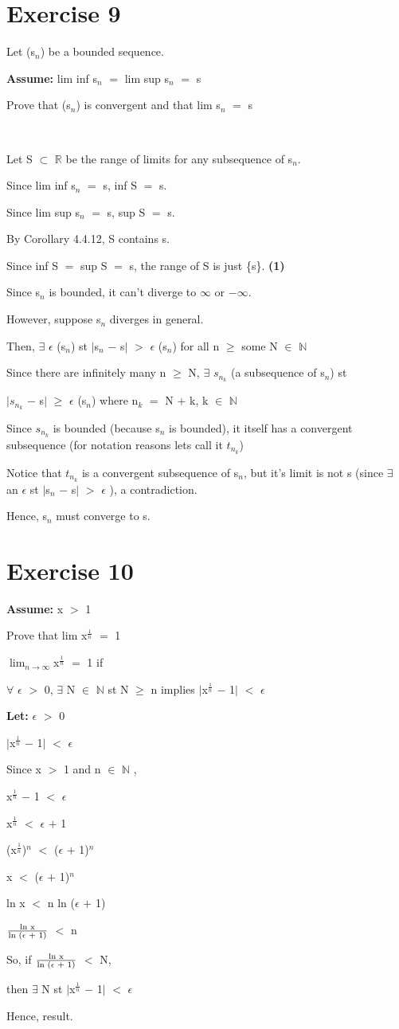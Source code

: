 \documentclass{article}
\newcommand{\mt}[1]{\ensuremath{#1}}
\newcommand\bsc[2][\DefaultOpt]{%
  \def\DefaultOpt{#2}%
  \section[#1]{#2}%
}
\newcommand{\lt}[1]{\textbf{Let: } #1}
\newcommand{\as}[1]{\textbf{Assume: } #1}
\newcommand{\bpth}[1]{\textbf{(#1)}}
\newcommand{\dbs}[3]{\mt{#1_{#2_#3}}}
\newcommand{\br}{\mt{\mathbb{R}} }       %
\newcommand{\bn}{\mt{\mathbb{N}} }       %
\newcommand{\ep}{\mt{\epsilon} }         %
\newcommand{\fa}{\mt{\forall} }          %
\newcommand{\mem}{\mt{\in} }
\newcommand{\exs}{\mt{\exists} }
\newcommand{\sbs}{\mt{\subset} }         %
\newcommand{\av}[1]{\mt{|}#1\mt{|}}  %
\newcommand{\prn}[1]{(#1)}
\newcommand{\bk}[1]{\{#1\}}
\newcommand{\ps}{\mt{+} }
\newcommand{\ms}{\mt{-} }
\newcommand{\ls}{\mt{<} }
\newcommand{\gr}{\mt{>} }
\newcommand{\gre}{\mt{\geq} }
\newcommand{\eql}{\mt{=} }
\newcommand{\uw}[2]{#1\mt{_{#2}}}
\newcommand{\uf}[2]{#1\mt{^{#2}}}
\newcommand{\frc}[2]{\mt{\frac{#1}{#2}}}
\newcommand{\lmti}[1]{\mt{\displaystyle{\lim_{#1 \to \infty}}}}
\newcommand{\infy}{\mt{\infty} }
\begin{document}
\bsc{Exercise 9}{

Let \prn{\uw{s}{n}} be a bounded sequence.

\as{lim inf \uw{s}{n} \eql lim sup \uw{s}{n} \eql s}

Prove that \prn{\uw{s}{n}} is convergent and that lim \uw{s}{n} \eql s

\

Let S \sbs \br be the range of limits for any subsequence of \uw{s}{n}.

Since lim inf \uw{s}{n} \eql s, inf S \eql s.

Since lim sup \uw{s}{n} \eql s, sup S \eql s.

By Corollary 4.4.12, S contains s.

Since inf S \eql sup S \eql s, the range of S is just \bk{s}. \bpth{1}

Since \uw{s}{n} is bounded, it can't diverge to \infy or $-\infty$.

However, suppose \uw{s}{n} diverges in general.

Then, \exs \ep(\uw{s}{n}) st \av{\uw{s}{n} \ms s} \gr \ep(\uw{s}{n}) for all n \gre some N \mem \bn

Since there are infinitely many n \gre N, \exs \dbs{s}{n}{k} (a subsequence of \uw{s}{n}) st 

\av{\dbs{s}{n}{k} \ms s} \gre \ep(\uw{s}{n}) where \uw{n}{k} \eql N \ps k, k \mem \bn

Since \dbs{s}{n}{k} is bounded (because \uw{s}{n} is bounded), it itself has a convergent subsequence (for notation reasons lets call it \dbs{t}{n}{k})

Notice that \dbs{t}{n}{k} is a convergent subsequence of \uw{s}{n}, but it's limit is not s (since \exs an \ep st \av{\uw{s}{n} \ms s} \gr \ep), a contradiction.

Hence, \uw{s}{n} must converge to s.

}

\bsc{Exercise 10}{

\as{x \gr 1}

Prove that lim \uf{x}{\frc{1}{n}} \eql 1

\lmti{n}\uf{x}{\frc{1}{n}} \eql 1 if

\fa \ep \gr 0, \exs N \mem \bn st N \gre n implies \av{\uf{x}{\frc{1}{n}} \ms 1} \ls \ep

\lt{\ep \gr 0}

\av{\uf{x}{\frc{1}{n}} \ms 1} \ls \ep

Since x \gr 1 and n \mem \bn,

\uf{x}{\frc{1}{n}} \ms 1 \ls \ep

\uf{x}{\frc{1}{n}} \ls \ep \ps 1

(\uf{x}{\frc{1}{n}})$^n$ \ls (\ep \ps 1)$^n$

x \ls (\ep \ps 1)$^n$

ln x \ls n ln (\ep \ps 1)

\frc{\textrm{ln x}}{\textrm{ln (\ep + 1)}} \ls n

So, if \frc{\textrm{ln x}}{\textrm{ln (\ep + 1)}} \ls N,

then \exs N st \av{\uf{x}{\frc{1}{n}} \ms 1} \ls \ep

Hence, result.
}
\end{document}
